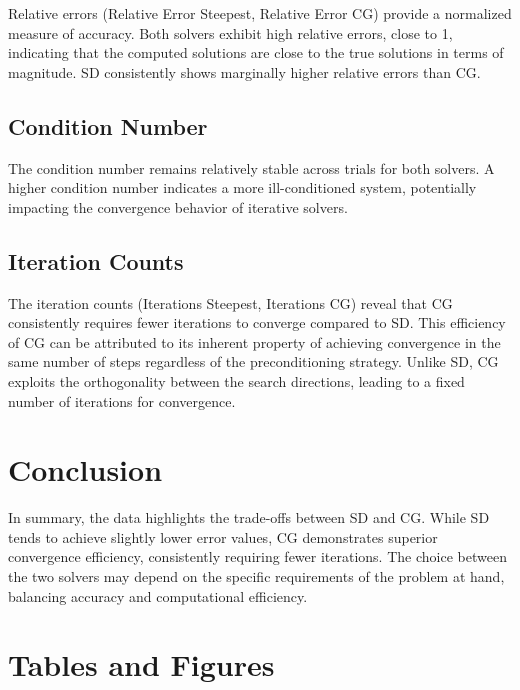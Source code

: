 \documentclass[12pt, letterpaper]{article}
\begin{document}
Relative errors (Relative Error Steepest, Relative Error CG) provide a normalized measure of accuracy. Both solvers exhibit high relative errors, close to 1, indicating that the computed solutions are close to the true solutions in terms of magnitude. SD consistently shows marginally higher relative errors than CG.

\subsection*{Condition Number}

The condition number remains relatively stable across trials for both solvers. A higher condition number indicates a more ill-conditioned system, potentially impacting the convergence behavior of iterative solvers.

\subsection*{Iteration Counts}

The iteration counts (Iterations Steepest, Iterations CG) reveal that CG consistently requires fewer iterations to converge compared to SD. This efficiency of CG can be attributed to its inherent property of achieving convergence in the same number of steps regardless of the preconditioning strategy. Unlike SD, CG exploits the orthogonality between the search directions, leading to a fixed number of iterations for convergence.

\section*{Conclusion}

In summary, the data highlights the trade-offs between SD and CG. While SD tends to achieve slightly lower error values, CG demonstrates superior convergence efficiency, consistently requiring fewer iterations. The choice between the two solvers may depend on the specific requirements of the problem at hand, balancing accuracy and computational efficiency.



\clearpage



\section{Tables and Figures}
\end{document}
